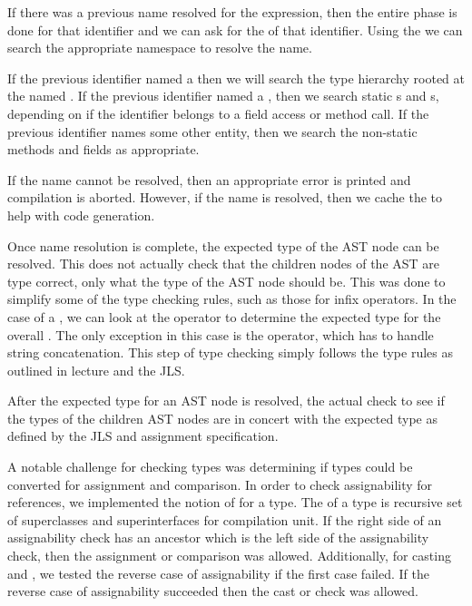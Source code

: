 \documentclass[pdftex,11pt,a4paper]{article}
\begin{document}
If there was a previous name resolved for the expression, then the
entire  phase is done for that identifier and we can
ask for the  of that identifier. Using the  we can
search the appropriate namespace to resolve the name.

If the previous identifier named a  then we will search the
type hierarchy rooted at the named . If the previous
identifier named a , then we search static s and
s, depending on if the identifier belongs to a field
access or method call. If the previous identifier names some other
entity, then we search the non-static methods and fields as
appropriate.

If the name cannot be resolved, then an appropriate error is printed
and compilation is aborted. However, if the name is resolved, then we
cache the  to help with code generation.

Once name resolution is complete, the expected type of the AST node
can be resolved. This does not actually check that the children nodes
of the AST are type correct, only what the type of the AST node should
be. This was done to simplify some of the type checking rules, such as
those for infix operators. In the case of a , we
can look at the operator to determine the expected type for the
overall . The only exception in this case is the
\ttt{+} operator, which has to handle string concatenation. This step
of type checking simply follows the type rules as outlined in lecture
and the JLS.

After the expected type for an AST node is resolved, the actual check
to see if the types of the children AST nodes are in concert with the
expected type as defined by the JLS and assignment specification.

A notable challenge for checking types was determining if types could
be converted for assignment and comparison. In order to check
assignability for references, we implemented the notion of
 for a type. The  of a type is
recursive set of superclasses and superinterfaces for compilation
unit. If the right side of an assignability check has an ancestor
which is the left side of the assignability check, then the assignment
or comparison was allowed. Additionally, for casting and
, we tested the reverse case of assignability if the
first case failed. If the reverse case of assignability succeeded then
the cast or  check was allowed.
\end{document}
